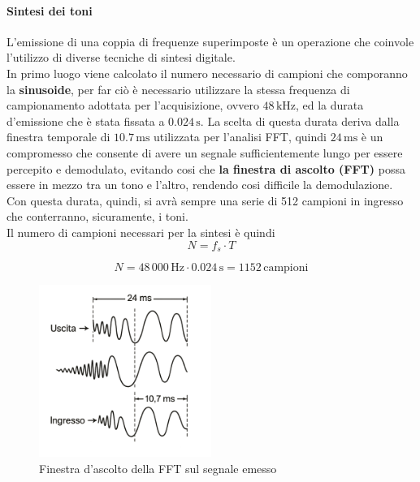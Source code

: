 \paragraph{Sintesi dei toni}
L'emissione di una coppia di frequenze superimposte è un operazione che coinvole l'utilizzo di diverse tecniche di sintesi digitale.\\
In primo luogo viene calcolato il numero necessario di campioni che comporanno la \textbf{sinusoide}, 
per far ciò è necessario utilizzare la stessa frequenza di campionamento adottata per l'acquisizione, ovvero $48\,\text{kHz}$, ed la durata d'emissione che
è stata fissata a $0.024\,\text{s}$.
La scelta di questa durata deriva dalla finestra temporale di $10.7\,\text{ms}$ utilizzata per l'analisi FFT, quindi $24\,\text{ms}$ 
è un compromesso che consente di avere un segnale sufficientemente lungo per essere percepito e demodulato, evitando cosi che \textbf{la finestra di ascolto (FFT)}
possa essere in mezzo tra un tono e l'altro, rendendo cosi difficile la demodulazione.
Con questa durata, quindi, si avrà sempre una serie di 512 campioni in ingresso che conterranno, sicuramente, i toni.\\

Il numero di campioni necessari per la sintesi è quindi 
\begin{equation}
    N = f_s \cdot T
    \end{equation}
    
    \begin{equation}
    N = 48\,000 \,\text{Hz} \cdot 0.024 \,\text{s} = 1152 \,\text{campioni}
    \end{equation}

    \begin{figure}[H]
        \centering
        \includegraphics[width=0.5\textwidth]{immagini/window_listening.png}
        \caption{Finestra d'ascolto della FFT sul segnale emesso}
        \label{fig:finestra_ascolto}
    \end{figure}

